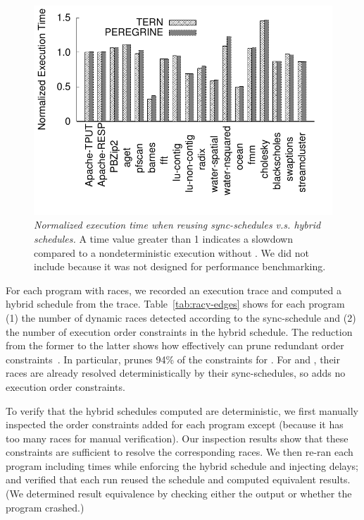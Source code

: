 \begin{figure}[t]
\centering
\includegraphics[width=0.7\columnwidth]{peregrine/figures/overhead}
\caption{{\em Normalized execution time when reusing sync-schedules
    v.s. hybrid schedules.}  A time value greater than 1
  indicates a slowdown compared to a nondeterministic execution without
  \peregrine.  We did not include \racey because it was not designed for
  performance benchmarking. } \label{fig:peregrine-overhead}
\end{figure}

For each program with races, we recorded an execution trace and computed a
hybrid schedule from the trace.  Table~\ref{tab:racy-edges} shows for each
program (1) the number of dynamic races detected according to the
sync-schedule and (2) the number of execution order constraints in the
hybrid schedule.  The reduction from the former to the latter shows how
effectively \peregrine can prune redundant order constraints~\cite{peregrine:sosp11}.
In particular, \peregrine prunes 94\% of the constraints
for \racey.  For \apache and
\streamcluster, their races are already resolved deterministically by
their sync-schedules, so \peregrine adds no execution order
constraints.

To verify that the hybrid schedules \peregrine computed are deterministic, we
first manually inspected the order constraints \peregrine added for each program
except \racey (because it has too many races for manual verification).  Our
inspection results show that these constraints are sufficient to resolve
the corresponding races.  We then re-ran each program including 
times while enforcing the hybrid schedule and injecting delays; 
and verified that each run reused the schedule and computed equivalent results.
(We determined result equivalence by checking either the output or whether
the program crashed.)


